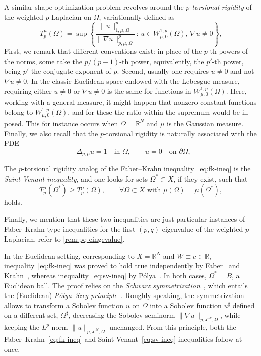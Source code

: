 \documentclass[a4paper,12pt,reqno]{amsart}
\numberwithin{equation}{section}
\renewcommand{\H}{\mathcal{H}}
\theoremstyle{plain}
\theoremstyle{definition}
\begin{document}
A similar shape optimization problem revolves around the \emph{$p$-torsional rigidity} of the weighted $p$-Laplacian on $\Omega$, variationally defined as
%
\begin{equation*}
T_{p}^\mu(\Omega)
=
\sup
\left\{
\frac{\|u\|^p_{1,\mu,\Omega}}{\|\nabla u\|^p_{p,\mu,\Omega}} \,:\, u\in W^{1,p}_{\mu,0}(\Omega),\, \nabla u \neq 0
\right\},
\end{equation*}
%
First, we remark that different conventions exist: in place of the $p$-th powers of the norms, some take the $p/(p-1)$-th power, equivalently, the $p'$-th power, being $p'$ the conjugate exponent of $p$. 
Second, usually one requires $u\neq 0$ and not $\nabla u \neq 0$. In the classic Euclidean space endowed with the Lebesgue measure, requiring either $u\neq 0$ or $\nabla u\neq 0$ is the same for functions in $W^{1,p}_{\mu,0}(\Omega)$.
Here, working with a general measure, it might happen that nonzero constant functions belong to $W^{1,p}_{\mu,0}(\Omega)$, and for these the ratio within the supremum would be ill-posed. This for instance occurs when $\Omega=\mathbb{R}^N$ and $\mu$ is the Gaussian measure.
Finally, we also recall that the $p$-torsional rigidity is naturally associated with the PDE
%
\[
-\Delta_{p,\mu} u = 1 \quad\text{in }\Omega,\qquad u=0\quad\text{on }\partial\Omega,
\]
%

The $p$-torsional rigidity analog of the Faber--Krahn inequality~\eqref{eq:fk-ineq} is the  \emph{Saint-Venant inequality}, and one looks for sets $\Omega^*\subset X$, if they exist,   such that 
%
\begin{equation}
\label{eq:sv-ineq}
T_{p}^\mu(\Omega^*) \ge T_{p}^\mu(\Omega), \qquad \forall \Omega\subset X \text{ with } \mu(\Omega)=\mu(\Omega^*),
\end{equation}
%
holds. 
%

Finally, we mention that these two inequalities are just particular instances of Faber--Krahn-type inequalities for the first $(p,q)$-eigenvalue of the weighted $p$-Laplacian, refer to \cref{rem:pq-eingevalue}.


In the Euclidean setting, corresponding to $X=\mathbb{R}^N$ and $W\equiv c\in\mathbb{R}$, inequality~\eqref{eq:fk-ineq} was proved to hold true independently by Faber~\cite{Fab23} and Krahn~\cite{Kra25}, whereas inequality~\eqref{eq:sv-ineq} by P\'olya~\cite{Pol48}. In both cases, $\Omega^*=B$, a Euclidean ball. 
The proof relies on the \emph{Schwarz symmetrization}~\cite{HL30,Sch90book}, which entails the (Euclidean) \emph{P\'olya--Szeg\H{o} principle}~\cite{PS51book}. Roughly speaking, the symmetrization allows to transform a Sobolev function $u$ on $\Omega$ into a Sobolev function $u^\sharp$ defined on a different set, $\Omega^\sharp$, decreasing the Sobolev seminorm $\|\nabla u\|_{p, \mathcal{L}^N,\Omega}$, while keeping  the $L^p$ norm $\|u\|_{p, \mathcal{L}^N,\Omega}$ unchanged. From this principle, both the Faber--Krahn~\eqref{eq:fk-ineq} and Saint-Venant~\eqref{eq:sv-ineq} inequalities  follow at once.
\end{document}

